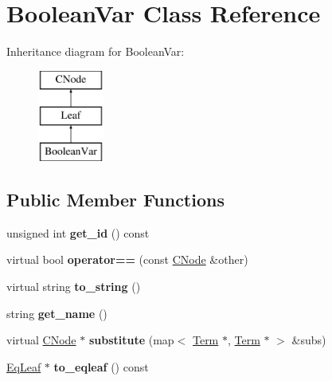 \hypertarget{classBooleanVar}{\section{\-Boolean\-Var \-Class \-Reference}
\label{classBooleanVar}
}
\-Inheritance diagram for \-Boolean\-Var\-:\begin{figure}[H]
\begin{center}
\leavevmode
\includegraphics[height=3.000000cm]{classBooleanVar}
\end{center}
\end{figure}
\subsection*{\-Public \-Member \-Functions}
\begin{DoxyCompactItemize}
\item 
\hypertarget{classBooleanVar_af2ffa57fa48de922257c2472b0d39ec4}{unsigned int {\bfseries get\-\_\-id} () const }\label{classBooleanVar_af2ffa57fa48de922257c2472b0d39ec4}

\item 
\hypertarget{classBooleanVar_a8b23054b63232d874f96c58be2221003}{virtual bool {\bfseries operator==} (const \hyperlink{classCNode}{\-C\-Node} \&other)}\label{classBooleanVar_a8b23054b63232d874f96c58be2221003}

\item 
\hypertarget{classBooleanVar_ab2cd6f443e4764db9b31fa3fbeac4b1c}{virtual string {\bfseries to\-\_\-string} ()}\label{classBooleanVar_ab2cd6f443e4764db9b31fa3fbeac4b1c}

\item 
\hypertarget{classBooleanVar_ac50895e6ba40c6f41041eb1da70cf832}{string {\bfseries get\-\_\-name} ()}\label{classBooleanVar_ac50895e6ba40c6f41041eb1da70cf832}

\item 
\hypertarget{classBooleanVar_a375ec1b5e7de706c21134b3b67aac029}{virtual \hyperlink{classCNode}{\-C\-Node} $\ast$ {\bfseries substitute} (map$<$ \hyperlink{classTerm}{\-Term} $\ast$, \hyperlink{classTerm}{\-Term} $\ast$ $>$ \&subs)}\label{classBooleanVar_a375ec1b5e7de706c21134b3b67aac029}

\item 
\hypertarget{classBooleanVar_a867c39319cce9690cbefb312e88ee05f}{\hyperlink{classEqLeaf}{\-Eq\-Leaf} $\ast$ {\bfseries to\-\_\-eqleaf} () const }\label{classBooleanVar_a867c39319cce9690cbefb312e88ee05f}

\end{DoxyCompactItemize}

